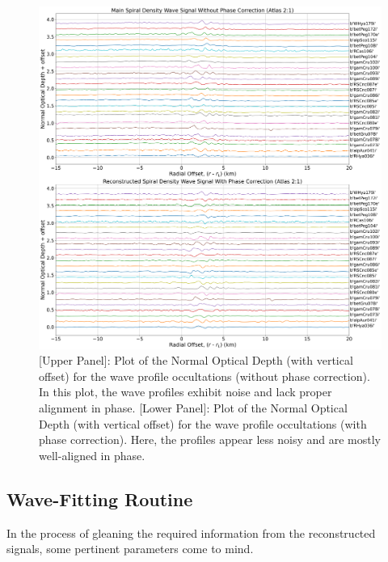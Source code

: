 \documentclass{article}
\begin{document}
\begin{figure}[h]
    \centering
    \includegraphics[width=1\linewidth]{main_and_reconstructed_profiles_atlas21_satellite_waves.png}
    \caption{[Upper Panel]: Plot of the Normal Optical Depth (with vertical offset) for the wave profile occultations (without phase correction). In this plot, the wave profiles exhibit noise and lack proper alignment in phase. [Lower Panel]: Plot of the Normal Optical Depth (with vertical offset) for the wave profile occultations (with phase correction). Here, the profiles appear less noisy and are mostly well-aligned in phase.}
    \label{fig:enter-label}
\end{figure}


\subsection{Wave-Fitting Routine}
In the process of gleaning the required information from the reconstructed signals, some pertinent parameters come to mind. 
\end{document}
